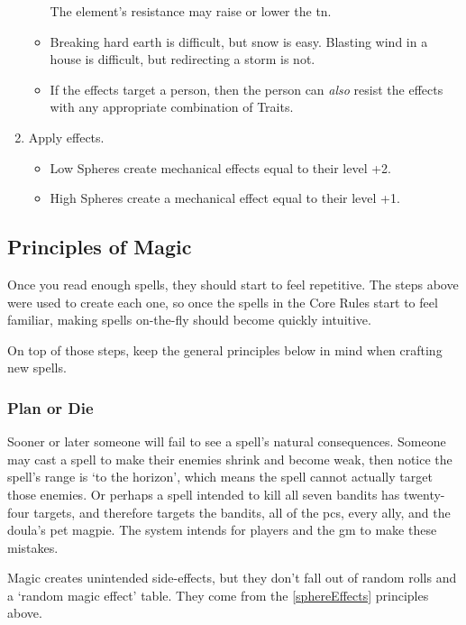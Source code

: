 \begin{multicols}{2}
\begin{enumerate}
\begin{itemize}
    The element's resistance may raise or lower the \gls{tn}.
    \item
    Breaking hard earth is difficult, but snow is easy.
    Blasting wind in a house is difficult, but redirecting a storm is not.
    \item
    If the effects target a person, then the person can \emph{also} resist the effects with any appropriate combination of Traits.
  \end{itemize}
  \item
  Apply effects.
  \label{sphereEffects}
  \begin{itemize}
    \item
    Low Spheres create mechanical effects equal to their level +2.
    \item
    High Spheres create a mechanical effect equal to their level +1.
  \end{itemize}
\end{enumerate}

\subsection{Principles of Magic}

Once you read enough spells, they should start to feel repetitive.
The steps above were used to create each one, so once the spells in the Core Rules start to feel familiar, making spells on-the-fly should become quickly intuitive.

On top of those steps, keep the general principles below in mind when crafting new spells.

\subsubsection{Plan or Die}

Sooner or later someone will fail to see a spell's natural consequences.
Someone may cast a spell to make their enemies shrink and become weak, then notice the spell's range is `to the horizon', which means the spell cannot actually target those enemies.
Or perhaps a spell intended to kill all seven bandits has twenty-four targets, and therefore targets the bandits, all of the \glspl{pc}, every ally, and the \gls{doula}'s pet magpie.
The system intends for players and the \gls{gm} to make these mistakes.

Magic creates unintended side-effects, but they don't fall out of random rolls and a `random magic effect' table.
They come from the \ref{sphereEffects} principles above.


\end{multicols}
